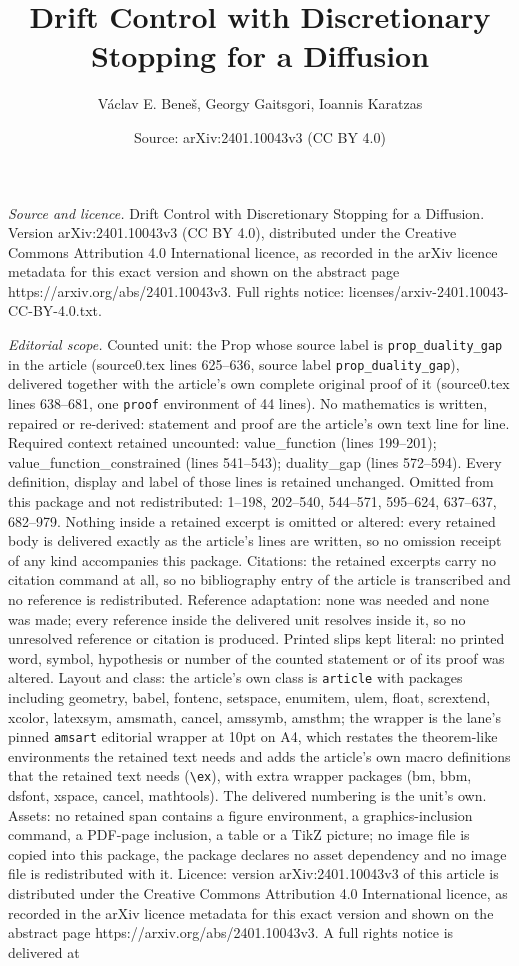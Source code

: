 \documentclass[10pt,a4paper]{amsart}
\title[Drift Control with Discretionary Stopping for a Diffusion]{Drift Control with Discretionary Stopping for a Diffusion}
\author{V\'aclav E. Bene\v{s}, Georgy Gaitsgori, Ioannis Karatzas}
\date{Source: arXiv:2401.10043v3 (CC BY 4.0)}
\begin{document}
\maketitle

\noindent\emph{Source and licence.} Drift Control with Discretionary Stopping for a Diffusion. Version arXiv:2401.10043v3 (CC BY 4.0), distributed under the Creative Commons Attribution 4.0 International licence, as recorded in the arXiv licence metadata for this exact version and shown on the abstract page https://arxiv.org/abs/2401.10043v3. Full rights notice: licenses/arxiv-2401.10043-CC-BY-4.0.txt.\par\smallskip

\noindent\textit{Editorial scope.} Counted unit: the Prop whose source label is \texttt{prop\_duality\_gap} in the article (source0.tex lines 625--636, source label \texttt{prop\_duality\_gap}), delivered together with the article's own complete original proof of it (source0.tex lines 638--681, one \texttt{proof} environment of 44 lines). No mathematics is written, repaired or re-derived: statement and proof are the article's own text line for line. Required context retained uncounted: value\_function (lines 199--201); value\_function\_constrained (lines 541--543); duality\_gap (lines 572--594). Every definition, display and label of those lines is retained unchanged. Omitted from this package and not redistributed: 1--198, 202--540, 544--571, 595--624, 637--637, 682--979. Nothing inside a retained excerpt is omitted or altered: every retained body is delivered exactly as the article's lines are written, so no omission receipt of any kind accompanies this package. Citations: the retained excerpts carry no citation command at all, so no bibliography entry of the article is transcribed and no reference is redistributed. Reference adaptation: none was needed and none was made; every reference inside the delivered unit resolves inside it, so no unresolved reference or citation is produced. Printed slips kept literal: no printed word, symbol, hypothesis or number of the counted statement or of its proof was altered. Layout and class: the article's own class is \texttt{article} with packages including geometry, babel, fontenc, setspace, enumitem, ulem, float, scrextend, xcolor, latexsym, amsmath, cancel, amssymb, amsthm; the wrapper is the lane's pinned \texttt{amsart} editorial wrapper at 10pt on A4, which restates the theorem-like environments the retained text needs and adds the article's own macro definitions that the retained text needs (\texttt{\textbackslash ex}), with extra wrapper packages (bm, bbm, dsfont, xspace, cancel, mathtools). The delivered numbering is the unit's own. Assets: no retained span contains a figure environment, a graphics-inclusion command, a PDF-page inclusion, a table or a TikZ picture; no image file is copied into this package, the package declares no asset dependency and no image file is redistributed with it. Licence: version arXiv:2401.10043v3 of this article is distributed under the Creative Commons Attribution 4.0 International licence, as recorded in the arXiv licence metadata for this exact version and shown on the abstract page https://arxiv.org/abs/2401.10043v3. A full rights notice is delivered at 
\end{document}
